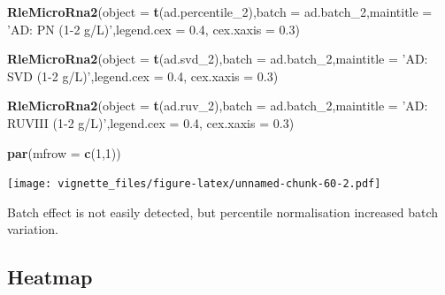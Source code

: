 \documentclass[]{book}
\newenvironment{Shaded}{\begin{snugshade}}{\end{snugshade}}
\newcommand{\KeywordTok}[1]{\textcolor[rgb]{0.13,0.29,0.53}{\textbf{#1}}}
\newcommand{\DataTypeTok}[1]{\textcolor[rgb]{0.13,0.29,0.53}{#1}}
\newcommand{\DecValTok}[1]{\textcolor[rgb]{0.00,0.00,0.81}{#1}}
\newcommand{\FloatTok}[1]{\textcolor[rgb]{0.00,0.00,0.81}{#1}}
\newcommand{\StringTok}[1]{\textcolor[rgb]{0.31,0.60,0.02}{#1}}
\newcommand{\NormalTok}[1]{#1}
\begin{document}
\begin{Shaded}
\begin{Highlighting}[]
\KeywordTok{RleMicroRna2}\NormalTok{(}\DataTypeTok{object =} \KeywordTok{t}\NormalTok{(ad.percentile_}\DecValTok{2}\NormalTok{),}\DataTypeTok{batch =}\NormalTok{ ad.batch_}\DecValTok{2}\NormalTok{,}\DataTypeTok{maintitle =} \StringTok{'AD: PN (1-2 g/L)'}\NormalTok{,}\DataTypeTok{legend.cex =} \FloatTok{0.4}\NormalTok{, }\DataTypeTok{cex.xaxis =} \FloatTok{0.3}\NormalTok{)}

\KeywordTok{RleMicroRna2}\NormalTok{(}\DataTypeTok{object =} \KeywordTok{t}\NormalTok{(ad.svd_}\DecValTok{2}\NormalTok{),}\DataTypeTok{batch =}\NormalTok{ ad.batch_}\DecValTok{2}\NormalTok{,}\DataTypeTok{maintitle =} \StringTok{'AD: SVD (1-2 g/L)'}\NormalTok{,}\DataTypeTok{legend.cex =} \FloatTok{0.4}\NormalTok{, }\DataTypeTok{cex.xaxis =} \FloatTok{0.3}\NormalTok{)}

\KeywordTok{RleMicroRna2}\NormalTok{(}\DataTypeTok{object =} \KeywordTok{t}\NormalTok{(ad.ruv_}\DecValTok{2}\NormalTok{),}\DataTypeTok{batch =}\NormalTok{ ad.batch_}\DecValTok{2}\NormalTok{,}\DataTypeTok{maintitle =} \StringTok{'AD: RUVIII (1-2 g/L)'}\NormalTok{,}\DataTypeTok{legend.cex =} \FloatTok{0.4}\NormalTok{, }\DataTypeTok{cex.xaxis =} \FloatTok{0.3}\NormalTok{)}

\KeywordTok{par}\NormalTok{(}\DataTypeTok{mfrow =} \KeywordTok{c}\NormalTok{(}\DecValTok{1}\NormalTok{,}\DecValTok{1}\NormalTok{))}
\end{Highlighting}
\end{Shaded}

\texttt{[image: vignette\_files/figure-latex/unnamed-chunk-60-2.pdf]}

Batch effect is not easily detected, but percentile normalisation
increased batch variation.

\subsection{Heatmap}\label{heatmap-1}
\end{document}
